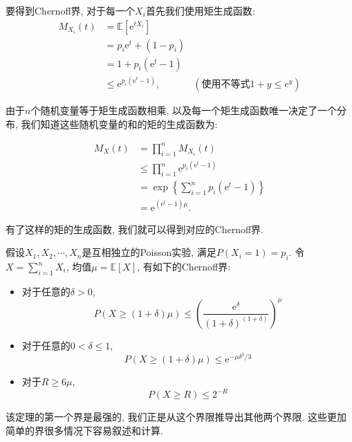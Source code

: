 要得到Chernoff界, 对于每一个$X_i$首先我们使用矩生成函数: 
$$
\begin{aligned}
M_{X_i}(t) & =\mathbb{E}\left[\mathrm{e}^{t X_i}\right] \\
& =p_i \mathrm{e}^t+\left(1-p_i\right) \\
& =1+p_i\left(\mathrm{e}^t-1\right) \\
& \leq \mathrm{e}^{p_i\left(\mathrm{e}^t-1\right)}, & (\text{使用不等式} 1+y\leq e^y)
\end{aligned}
$$

由于$n$个随机变量等于矩生成函数相乘, 以及每一个矩生成函数唯一决定了一个分布, 我们知道这些随机变量的和的矩的生成函数为: 

$$
\begin{aligned}
M_X(t) & =\prod_{i=1}^n M_{X_i}(t) \\
& \leq \prod_{i=1}^n \mathrm{e}^{p_i\left(\mathrm{e}^t-1\right)} \\
& =\exp \left\{\sum_{i=1}^n p_i\left(\mathrm{e}^t-1\right)\right\} \\
& =\mathrm{e}^{\left(\mathrm{e}^t-1\right) \mu} .
\end{aligned}
$$

有了这样的矩的生成函数, 我们就可以得到对应的Chernoff界. 
\begin{theorem}
    假设$X_1, X_2, \cdots, X_n$是互相独立的Poisson实验, 满足$P\left(X_i=1\right)=p_i$. 令$X=\sum_{i=1}^n X_i$, 均值$\mu=\mathbb{E}[X]$, 有如下的Chernoff界: 
    \begin{itemize}
        \item 对于任意的$\delta>0$, $$P(X \geq(1+\delta) \mu) \leq\left(\frac{\mathrm{e}^\delta}{(1+\delta)^{(1+\delta)}}\right)^\mu$$
        \item 对于任意的$0<\delta\leq 1$, $$
        P(X \geq(1+\delta) \mu) \leq \mathrm{e}^{-\mu \delta^2 / 3}$$
        \item 对于$R\geq 6\mu$, $$
        P(X \geq R) \leq 2^{-R}$$
    \end{itemize}
\end{theorem}

该定理的第一个界是最强的, 我们正是从这个界限推导出其他两个界限. 这些更加简单的界很多情况下容易叙述和计算. 

